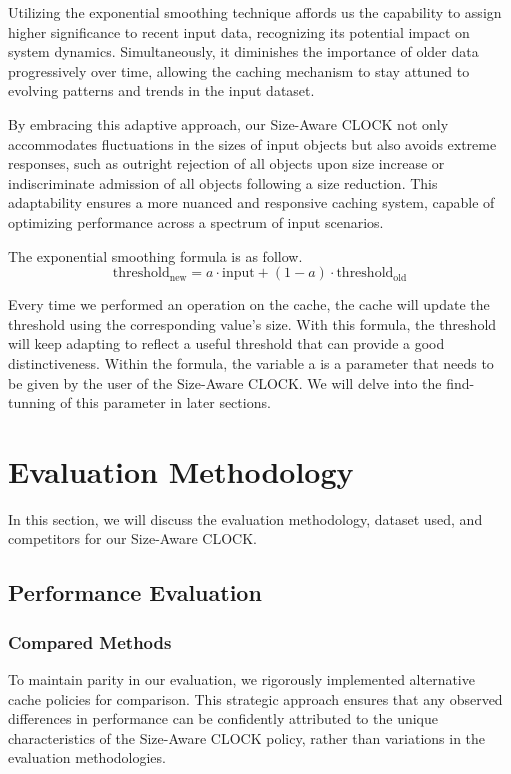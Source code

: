 \documentclass[conference]{IEEEtran}
\begin{document}
Utilizing the exponential smoothing technique affords us the capability to assign higher significance to recent input data, recognizing its potential impact on system dynamics. Simultaneously, it diminishes the importance of older data progressively over time, allowing the caching mechanism to stay attuned to evolving patterns and trends in the input dataset.

By embracing this adaptive approach, our Size-Aware CLOCK not only accommodates fluctuations in the sizes of input objects but also avoids extreme responses, such as outright rejection of all objects upon size increase or indiscriminate admission of all objects following a size reduction. This adaptability ensures a more nuanced and responsive caching system, capable of optimizing performance across a spectrum of input scenarios. 

The exponential smoothing formula is as follow.
\[
\text{threshold}_{\text{new}} = a \cdot \text{input} + (1 - a) \cdot \text{threshold}_{\text{old}}
\]

Every time we performed an operation on the cache, the cache will update the threshold using the corresponding value's size. With this formula, the threshold will keep adapting to reflect a useful threshold that can provide a good distinctiveness.
Within the formula, the variable a is a parameter that needs to be given by the user of the Size-Aware CLOCK. We will delve into the find-tunning of this parameter in later sections.



\section{Evaluation Methodology}
In this section, we will discuss the evaluation methodology, dataset used, and competitors for our Size-Aware CLOCK.

\subsection{Performance Evaluation}
\subsubsection{Compared Methods}
To maintain parity in our evaluation, we rigorously implemented alternative cache policies for comparison. This strategic approach ensures that any observed differences in performance can be confidently attributed to the unique characteristics of the Size-Aware CLOCK policy, rather than variations in the evaluation methodologies.
\end{document}
